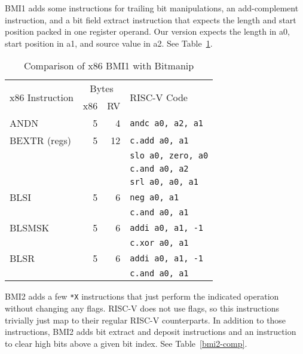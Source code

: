 BMI1 adds some instructions for trailing bit manipulations, an add-complement instruction,
and a bit field extract instruction that expects the length and start position packed in one
register operand. Our version expects the length in a0, start position in a1, and source
value in a2. See Table~\ref{bmi1-comp}.

\begin{table}[h]
\centering
\begin{tabular}{lrrl}
\multirow{2}{*}{x86 Instruction} & \multicolumn{2}{c}{Bytes} & \multirow{2}{*}{RISC-V Code} \\
& x86 & RV & \\
\hline
ANDN    & 5 &  4 & {\tt andc a0, a2, a1} \\
\hline
BEXTR (regs)  & 5 & 12 & {\tt c.add a0, a1} \\
              &   &    & {\tt slo a0, zero, a0} \\
              &   &    & {\tt c.and a0, a2} \\
              &   &    & {\tt srl a0, a0, a1} \\
\hline
BLSI          & 5 &  6 & {\tt neg a0, a1} \\
              &   &    & {\tt c.and a0, a1} \\
\hline
BLSMSK        & 5 &  6 & {\tt addi a0, a1, -1} \\
              &   &    & {\tt c.xor a0, a1} \\
\hline
BLSR          & 5 &  6 & {\tt addi a0, a1, -1} \\
              &   &    & {\tt c.and a0, a1} \\
\end{tabular}
\caption{Comparison of x86 BMI1 with Bitmanip}
\label{bmi1-comp}
\end{table}

BMI2 adds a few \texttt{*X} instructions that just perform the indicated
operation without changing any flags. RISC-V does not use flags, so this
instructions trivially just map to their regular RISC-V counterparts. In
addition to those instructions, BMI2 adds bit extract and deposit instructions
and an instruction to clear high bits above a given bit index. See Table~\ref{bmi2-comp}.

